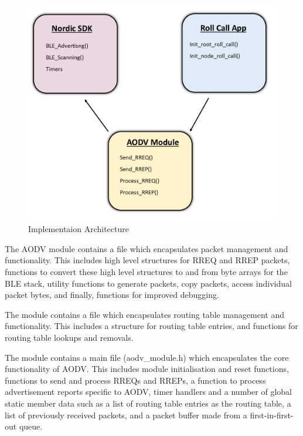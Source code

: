     \FloatBarrier
    \begin{figure}[ht]
      \includegraphics[scale=0.25]{Images/chapter4/architecture.png}
      \caption{Implementaion Architecture}
      \label{fig:architecture}
    \end{figure}
    \FloatBarrier

    The AODV module contains a file which encapsulates packet management and
    functionality. This includes high level structures for RREQ and RREP packets,
    functions to convert these high level structures to and from byte arrays for the
    BLE stack, utility functions to generate packets, copy packets, access individual packet
    bytes, and finally, functions for improved debugging.

    The module contains a file which encapsulates routing table management and
    functionality. This includes a structure for routing table entries, and functions
    for routing table lookups and removals.

    The module contains a main file (aodv\_module.h) which encapsulates the core
    functionality of AODV. This includes module initialisation and reset functions,
    functions to send and process RREQs and RREPs, a function to process advertisement
    reports specific to AODV, timer handlers and a number of global static member
    data such as a list of routing table entries as the routing table, a list of previously
    received packets, and a packet buffer made from a first-in-first-out queue.

